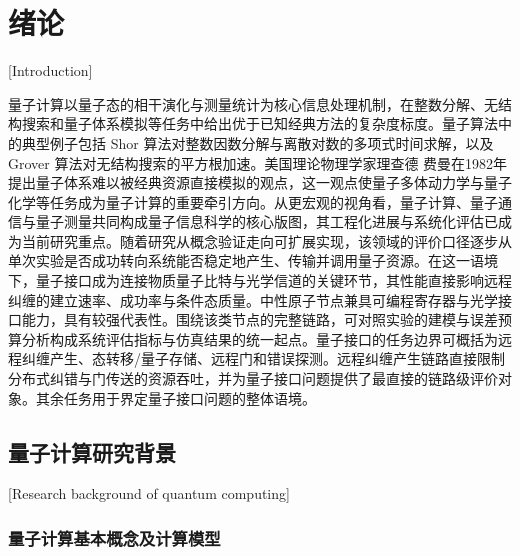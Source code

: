 ﻿

\chapter{绪论}[Introduction]

量子计算以量子态的相干演化与测量统计为核心信息处理机制，在整数分解、无结构搜索和量子体系模拟等任务中给出优于已知经典方法的复杂度标度\cite{NielsenChuang2010QCQI,NationalAcademies2019QC,Li2025QIT}。量子算法中的典型例子包括 Shor 算法对整数因数分解与离散对数的多项式时间求解，以及 Grover 算法对无结构搜索的平方根加速\cite{Shor1994Algorithms,Grover1997QuantumSearch,Li2025QIT}。美国理论物理学家理查德 费曼在1982年提出量子体系难以被经典资源直接模拟的观点，这一观点使量子多体动力学与量子化学等任务成为量子计算的重要牵引方向\cite{Feynman1982Simulating,Cao2019QuantumChemistry,Li2025QIT}。从更宏观的视角看，量子计算、量子通信与量子测量共同构成量子信息科学的核心版图，其工程化进展与系统化评估已成为当前研究重点\cite{Li2025QIT}。随着研究从概念验证走向可扩展实现，该领域的评价口径逐步从单次实验是否成功转向系统能否稳定地产生、传输并调用量子资源\cite{Preskill2018NISQ,NationalAcademies2019QC,Li2025QIT}。在这一语境下，量子接口成为连接物质量子比特与光学信道的关键环节，其性能直接影响远程纠缠的建立速率、成功率与条件态质量\cite{Reiserer2022CavityEnhancedNetworkNodes,Awschalom2021QuIC,Li2023QNS}。中性原子节点兼具可编程寄存器与光学接口能力，具有较强代表性\cite{Covey2023QuantumNetworksNeutralAtomNodes,Li2023QNS}。围绕该类节点的完整链路，可对照实验的建模与误差预算分析构成系统评估指标与仿真结果的统一起点。量子接口的任务边界可概括为远程纠缠产生、态转移/量子存储、远程门和错误探测。远程纠缠产生链路直接限制分布式纠错与门传送的资源吞吐，并为量子接口问题提供了最直接的链路级评价对象。其余任务用于界定量子接口问题的整体语境。

\section{量子计算研究背景}[Research background of quantum computing]

\subsection{量子计算基本概念及计算模型}


